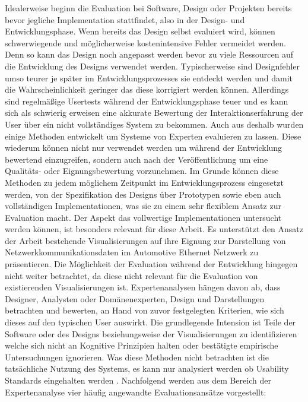 \documentclass[draft=false
              ,paper=a4
              ,twoside=false
              ,fontsize=11pt
              ,headsepline
              ,BCOR10mm
              ,DIV11
              ]{scrbook}
\begin{document}
Idealerweise beginn die Evaluation bei Software, Design oder Projekten bereits bevor jegliche Implementation stattfindet, also in der Design- und Entwicklungsphase. Wenn bereits das Design selbst evaluiert wird, können schwerwiegende und möglicherweise kostenintensive Fehler vermeidet werden. Denn so kann das Design noch angepasst werden bevor zu viele Ressourcen auf die Entwicklung des Designs verwendet werden.  Typischerweise sind Designfehler umso teurer je später im Entwicklungsprozesses sie entdeckt werden und damit die Wahrscheinlichkeit geringer das diese korrigiert werden können. Allerdings sind regelmäßige Usertests während der Entwicklungsphase teuer und es kann sich als schwierig erweisen eine akkurate Bewertung der Interaktionserfahrung der User über ein nicht vollständiges System zu bekommen. Auch aus deshalb wurden einige Methoden entwickelt um Systeme von Experten evaluieren zu lassen. Diese wiederum können nicht nur verwendet werden um während der Entwicklung bewertend einzugreifen, sondern auch nach der Veröffentlichung um eine Qualitäts- oder Eignungsbewertung vorzunehmen. Im Grunde können diese Methoden zu jedem möglichem Zeitpunkt im Entwicklungsprozess eingesetzt werden, von der Spezifikation des Designs über Prototypen sowie eben auch vollständigen Implementationen, was sie zu einem sehr flexiblem Ansatz zur Evaluation macht. Der Aspekt das  vollwertige Implementationen untersucht werden können, ist besonders relevant für diese Arbeit. Es unterstützt den Ansatz der Arbeit bestehende Visualisierungen auf ihre Eignung zur Darstellung von Netzwerkkommunikationsdaten im Automotive Ethernet Netzwerk zu präsentieren. Die Möglichkeit der Evaluation während der Entwicklung hingegen nicht weiter betrachtet, da diese nicht relevant für die Evaluation von existierenden Visualisierungen ist. Expertenanalysen hängen davon ab, dass Designer, Analysten oder Domänenexperten, Design und Darstellungen betrachten und bewerten, an Hand von zuvor festgelegten Kriterien,  wie sich dieses auf den typischen User auswirkt. Die grundlegende Intension ist Teile der Software oder des Designs beziehungsweise der Visualisierungen zu identifizieren welche sich nicht an Kognitive Prinzipien halten oder bestätigte empirische Untersuchungen ignorieren. Was diese Methoden nicht betrachten ist die tatsächliche Nutzung des Systems, es kann nur analysiert werden ob Usability Standards eingehalten werden \cite{alan_dix_human-computer_2004}. 
Nachfolgend werden aus dem Bereich der Expertenanalyse vier häufig angewandte Evaluationsansätze vorgestellt: 
\end{document}

